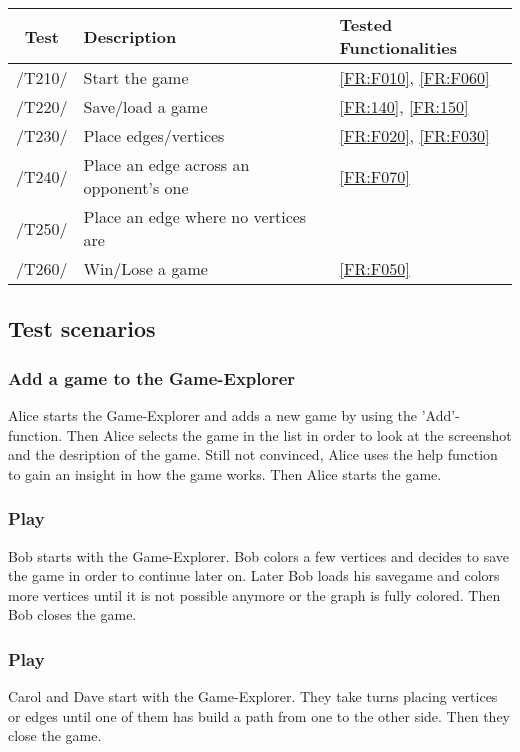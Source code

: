 \begin{tabular}{cll}

\hline
\textbf{Test} & \textbf{Description} & \textbf{Tested Functionalities} \\
\hline
/T210/ & Start the game & \ref{FR:F010}, \ref{FR:F060} \\
/T220/ & Save/load a game & \ref{FR:140}, \ref{FR:150} \\
/T230/ & Place edges/vertices & \ref{FR:F020}, \ref{FR:F030} \\
/T240/ & Place an edge across an opponent's one & \ref{FR:F070} \\
/T250/ & Place an edge where no vertices are & \\
/T260/ & Win/Lose a game & \ref{FR:F050} \\
\hline

\end{tabular}

\subsection{Test scenarios}

\subsubsection{Add a game to the Game-Explorer}

Alice starts the Game-Explorer and adds a new game by using the 'Add'-function. Then Alice selects the game in the list in order to look at the screenshot and the desription of the game. Still not convinced, Alice uses the help function to gain an insight in how the game works. Then Alice starts the game.

\subsubsection{Play \graphcoloring}

Bob starts {\graphcoloring} with the Game-Explorer. Bob colors a few vertices and decides to save the game in order to continue later on. Later Bob loads his savegame and colors more vertices until it is not possible anymore or the graph is fully colored. Then Bob closes the game.

\subsubsection{Play \twixt}

Carol and Dave start {\twixt} with the Game-Explorer. They take turns placing vertices or edges until one of them has build a path from one to the other side. Then they close the game.
